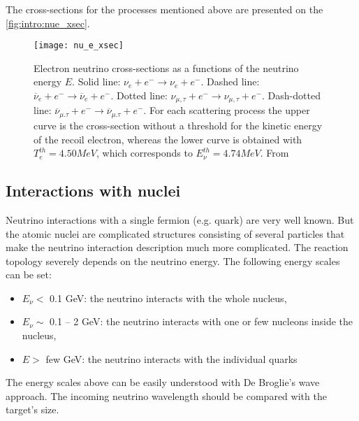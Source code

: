 \documentclass[../main.tex]{subfiles}
\begin{document}
The cross-sections for the processes mentioned above are presented on the \autoref{fig:intro:nue_xsec}.

\begin{figure}[!ht]
  \centering
  \texttt{[image: nu\_e\_xsec]}
  \caption{Electron neutrino cross-sections as a functions of the neutrino energy $E$. Solid line: $\nu_e+e^-\to\nu_e+e^-$. Dashed line: $\overline{\nu}_e+e^-\to\overline{\nu}_e+e^-$. Dotted line: $\nu_{\mu, \tau}+e^-\to\nu_{\mu, \tau}+e^-$. Dash-dotted line: $\overline{\nu}_{\mu. \tau}+e^-\to\overline{\nu}_{\mu. \tau}+e^-$. For each scattering process the upper curve is the cross-section without a threshold for the kinetic energy of the recoil electron, whereas the lower curve is obtained with $T_e^{th}=4.50 MeV$, which corresponds to $E_\nu^{th} = 4.74 MeV$. From~\cite{Auerbach2001}}
  \label{fig:intro:nue_xsec}
\end{figure}


\subsection{Interactions with nuclei}
\label{sec:intro:nuclei}
Neutrino interactions with a single fermion (e.g. quark) are very well known. But the atomic nuclei are complicated structures consisting of several particles that make the neutrino interaction description much more complicated. The reaction topology severely depends on the neutrino energy. The following energy scales can be set:
\begin{itemize}
  \item $E_\nu <$ 0.1 GeV: the neutrino interacts with the whole nucleus,
  \item $E_\nu\sim$ 0.1 -- 2 GeV: the neutrino interacts with one or few nucleons inside the nucleus,
  \item $E>$ few GeV: the neutrino interacts with the individual quarks
\end{itemize}

The energy scales above can be easily understood with De Broglie's wave approach. The incoming neutrino wavelength should be compared with the target's size.
\end{document}
